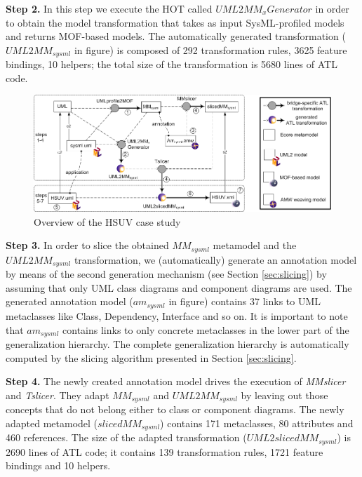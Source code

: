 \textbf{Step 2.} In this step we execute the HOT called $UML2MM_xGenerator$ in order to obtain the
model transformation that takes as input SysML-profiled models and returns MOF-based models. The automatically generated transformation
($UML2MM_{sysml}$ in figure) is composed of 292 transformation rules, 3625 feature bindings, 10 helpers; the total size of the transformation is 5680 lines of ATL code.
%
\vspace{-.4cm}
\begin{figure}[htbp]
	\centering
		\includegraphics[width=1\textwidth]{figures/caseStudy.png}
	\caption{Overview of the HSUV case study}
	\label{fig:caseStudy}
\end{figure}
\vspace{-.6cm}

\textbf{Step 3.} In order to slice the obtained $MM_{sysml}$ metamodel and the $UML2MM_{sysml}$ transformation,
we (automatically) generate an annotation model by means of the second generation mechanism
(see Section \ref{sec:slicing}) by assuming that only UML class diagrams and component diagrams are used.
The generated annotation model ($am_{sysml}$ in figure) contains 37 links to UML metaclasses like Class, Dependency, Interface and so on.
It is important to note that $am_{sysml}$ contains links to only concrete metaclasses in the lower part of the generalization hierarchy. The complete generalization hierarchy is automatically computed by the slicing algorithm presented in Section \ref{sec:slicing}.

\textbf{Step 4.} The newly created annotation model drives the execution of \textit{MMslicer} and \textit{Tslicer}.
They adapt $MM_{sysml}$ and $UML2MM_{sysml}$ by leaving out those concepts that do not
belong either to class or component diagrams.
The newly adapted metamodel ($slicedMM_{sysml}$) contains 171 metaclasses, 80 attributes and 460 references.
The size of the adapted transformation ($UML2slicedMM_{sysml}$) is 2690 lines
of ATL code; it contains 139 transformation rules, 1721 feature bindings and 10 helpers.

